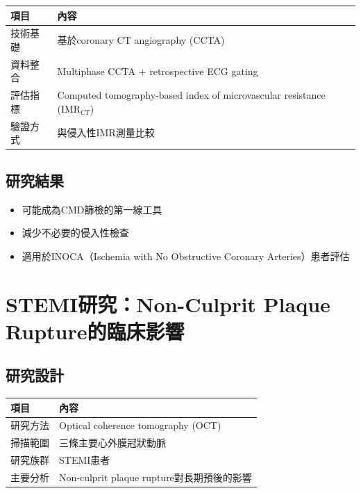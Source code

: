 \documentclass[12pt,a4paper]{article}
\begin{document}
\begin{longtable}{p{4cm}p{10cm}}
\toprule
\textbf{項目} & \textbf{內容} \\
\midrule
\endfirsthead
\bottomrule
\endfoot

技術基礎 & 基於coronary CT angiography (CCTA) \\
\midrule
資料整合 & Multiphase CCTA + retrospective ECG gating \\
\midrule
評估指標 & Computed tomography-based index of microvascular resistance (IMR$_{CT}$) \\
\midrule
驗證方式 & 與侵入性IMR測量比較 \\
\bottomrule
\end{longtable}

\subsection{研究結果}


\begin{tcolorbox}[colback=emergency_blue!5!white,colframe=emergency_blue,title=\textbf{臨床意義}]
\begin{itemize}
    \item 可能成為CMD篩檢的第一線工具
    \item 減少不必要的侵入性檢查
    \item 適用於INOCA（Ischemia with No Obstructive Coronary Arteries）患者評估
\end{itemize}
\end{tcolorbox}

\section{STEMI研究：Non-Culprit Plaque Rupture的臨床影響}

\subsection{研究設計}

\begin{longtable}{p{4cm}p{10cm}}
\toprule
\textbf{項目} & \textbf{內容} \\
\midrule
\endfirsthead
\bottomrule
\endfoot

研究方法 & Optical coherence tomography (OCT) \\
\midrule
掃描範圍 & 三條主要心外膜冠狀動脈 \\
\midrule
研究族群 & STEMI患者 \\
\midrule
主要分析 & Non-culprit plaque rupture對長期預後的影響 \\
\bottomrule
\end{longtable}
\end{document}
